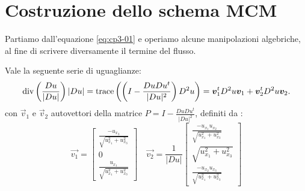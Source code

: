 \section{Costruzione dello schema MCM}
\label{sec:cp3-sc3-1}
Partiamo dall'equazione \eqref{eq:cp3-01} e operiamo alcune manipolazioni algebriche, al fine di scrivere diversamente il termine del flusso. 
\begin{proposizione}
\label{prop:cp3-01}
Vale la seguente serie di uguaglianze:
\[
\operatorname{div}\left(\frac{Du}{|Du|}\right)|Du|=\operatorname{trace}\left(\left(I-\frac{DuDu^t}{|Du|^2}\right)D^2u\right)=\bm{v}_1^tD^2u\bm{v}_1+\bm{v}_2^tD^2u\bm{v}_2.
\]
con $\vec{v}_1$ e $\vec{v}_2$ autovettori della matrice $P=I-\frac{DuDu^t}{|Du|^2}$, definiti da :
\[
\vec{v_1}=
\begin{bmatrix}
\frac{-u_{x_3}}{\sqrt{u_{x_1}^2+u_{x_3}^2}} \\
0 \\
\frac{u_{x_1}}{\sqrt{u_{x_1}^2+u_{x_3}^2}}
\end{bmatrix}
\quad
\vec{v_2}=\frac{1}{|Du|}
\begin{bmatrix}
\frac{-u_{x_1}u_{x_2}}{\sqrt{u_{x_1}^2+u_{x_3}^2}} \\
\sqrt{u_{x_1}^2+u_{x_3}^2} \\
\frac{-u_{x_2}u_{x_3}}{\sqrt{u_{x_1}^2+u_{x_3}^2}}
\end{bmatrix}
\]
\end{proposizione}
